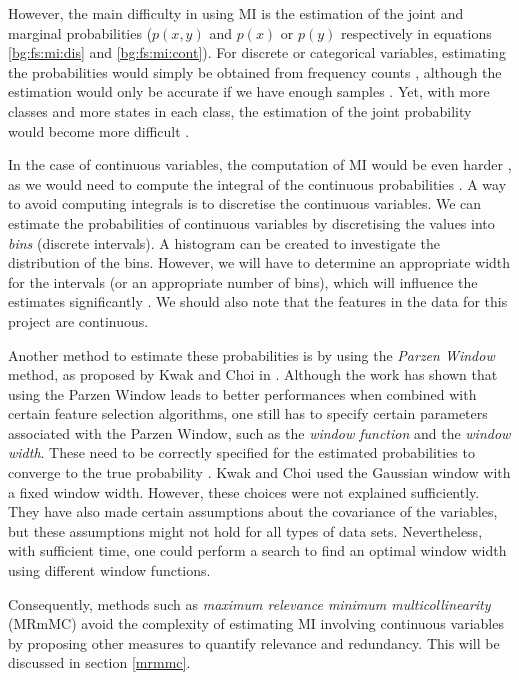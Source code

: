 \documentclass[12pt, twoside, a4paper]{report}
\begin{document}
However, the main difficulty in using MI is the estimation of the joint and marginal probabilities ($p(x, y)$ and $p(x)$ or $p(y)$ respectively in equations \ref{bg:fs:mi:dis} and \ref{bg:fs:mi:cont}). For discrete or categorical variables, estimating the probabilities would simply be obtained from frequency counts \cite{RefWorks:183}, although the estimation would only be accurate if we have enough samples \cite{RefWorks:182}. Yet, with more classes and more states in each class, the estimation of the joint probability would become more difficult \cite{RefWorks:140}.

In the case of continuous variables, the computation of MI would be even harder \cite{RefWorks:185}, as we would need to compute the integral of the continuous probabilities \cite{RefWorks:192}. A way to avoid computing integrals is to discretise the continuous variables. We can estimate the probabilities of continuous variables by discretising the values into \textit{bins} (discrete intervals). A histogram can be created to investigate the distribution of the bins. However, we will have to determine an appropriate width for the intervals (or an appropriate number of bins), which will influence the estimates significantly \cite{RefWorks:186}. We should also note that the features in the data for this project are continuous. 

Another method to estimate these probabilities is by using the \textit{Parzen Window} method, as proposed by Kwak and Choi in \cite{RefWorks:183}. Although the work has shown that using the Parzen Window leads to better performances when combined with certain feature selection algorithms, one still has to specify certain parameters associated with the Parzen Window, such as the \textit{window function} and the \textit{window width}. These need to be correctly specified for the estimated probabilities to converge to the true probability \cite{RefWorks:184}. Kwak and Choi used the Gaussian window with a fixed window width. However, these choices were not explained sufficiently. They have also made certain assumptions about the covariance of the variables, but these assumptions might not hold for all types of data sets. Nevertheless, with sufficient time, one could perform a search to find an optimal window width using different window functions.

Consequently, methods such as \textit{maximum relevance minimum multicollinearity} (MRmMC) \cite{RefWorks:187} avoid the complexity of estimating MI involving continuous variables by proposing other measures to quantify relevance and redundancy. This will be discussed in section \ref{mrmmc}.
\end{document}
